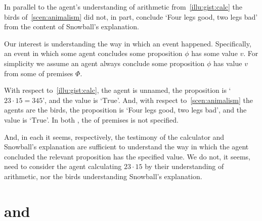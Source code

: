 \begin{note}
  In parallel to the agent's understanding of arithmetic from~\autoref{illu:gist:calc} the birds of~\autoref{scen:animalism} did not, in part, conclude `Four legs good, two legs bad' from the content of Snowball's explanation.

  Our interest is understanding the way in which an event happened.
  Specifically, an event in which some agent \vAgent{} concludes some proposition \(\phi\) has some value \(v\).
  For simplicity we assume an agent always conclude some proposition \(\phi\) has value \(v\) from some \poP{} of premises \(\Phi\).

  With respect to~\autoref{illu:gist:calc}, the agent is unnamed, the proposition is `\(23 \cdot 15 = 345\)', and the value is `\(\text{True}\)'.
  And, with respect to~\autoref{scen:animalism} the agents are the birds, the proposition is `Four legs good, two legs bad', and the value is `\(\text{True}\)'.
  In both , the \poP{} of premises is not specified.

  And, in each  it seems, respectively, the testimony of the calculator and Snowball's explanation are sufficient to understand the way in which the agent concluded the relevant proposition has the specified value.
  We do not, it seems, need to consider the agent calculating \(23 \cdot 15\) by their understanding of arithmetic, nor the birds understanding Snowball's explanation.
\end{note}

\section*{\qWhy{} and \qHow{}}
\label{cha:intro:why-how}

